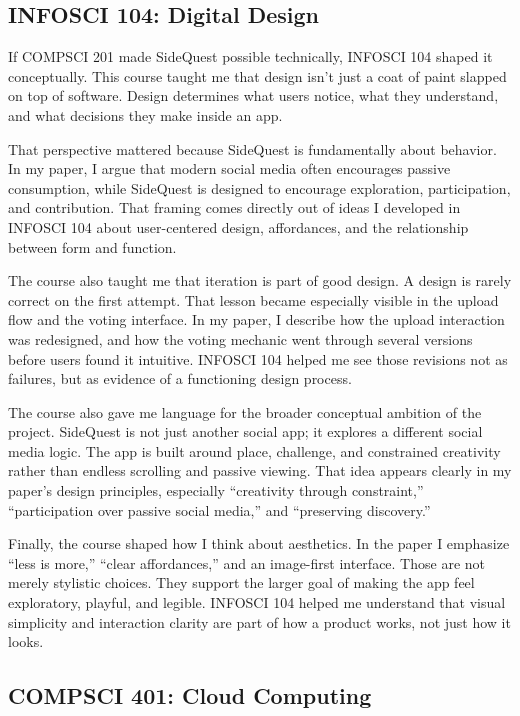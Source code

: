 \documentclass[12pt,a4paper,oneside]{report}
\begin{document}
\subsection*{INFOSCI 104: Digital Design}

If COMPSCI 201 made SideQuest possible technically, INFOSCI 104 shaped it conceptually. This course taught me that design isn't just a coat of paint slapped on top of software. Design determines what users notice, what they understand, and what decisions they make inside an app.

That perspective mattered because SideQuest is fundamentally about behavior. In my paper, I argue that modern social media often encourages passive consumption, while SideQuest is designed to encourage exploration, participation, and contribution. That framing comes directly out of ideas I developed in INFOSCI 104 about user-centered design, affordances, and the relationship between form and function.

The course also taught me that iteration is part of good design. A design is rarely correct on the first attempt. That lesson became especially visible in the upload flow and the voting interface. In my paper, I describe how the upload interaction was redesigned, and how the voting mechanic went through several versions before users found it intuitive. INFOSCI 104 helped me see those revisions not as failures, but as evidence of a functioning design process.

The course also gave me language for the broader conceptual ambition of the project. SideQuest is not just another social app; it explores a different social media logic. The app is built around place, challenge, and constrained creativity rather than endless scrolling and passive viewing. That idea appears clearly in my paper’s design principles, especially “creativity through constraint,” “participation over passive social media,” and “preserving discovery.”

Finally, the course shaped how I think about aesthetics. In the paper I emphasize “less is more,” “clear affordances,” and an image-first interface. Those are not merely stylistic choices. They support the larger goal of making the app feel exploratory, playful, and legible. INFOSCI 104 helped me understand that visual simplicity and interaction clarity are part of how a product works, not just how it looks.

\subsection*{COMPSCI 401: Cloud Computing}
\end{document}
